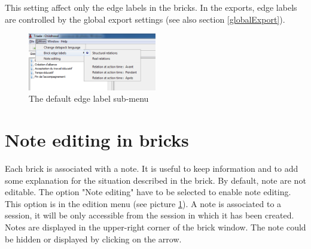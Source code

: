 This setting affect only the edge labels in the bricks. In the exports, edge labels are controlled by the global export settings (see also section \ref{globalExport}).\\

\begin{figure}[h!]
\centering
\includegraphics[width=0.5\textwidth]{images/menu_edition.png}
\caption{The default edge label sub-menu}
\label{menu_edition}
\end{figure}


\section{Note editing in bricks}
Each brick is associated with a note. It is useful to keep information and to add some explanation for the situation described in the brick. By default, note are not editable. The option "Note editing" have to be selected to enable note editing. This option is in the edition menu (see picture \ref{menu_edition}). A note is associated to a session, it will be only accessible from the session in which it has been created.\\

Notes are displayed in the upper-right corner of the brick window. The note could be hidden or displayed by clicking on the arrow.\\

